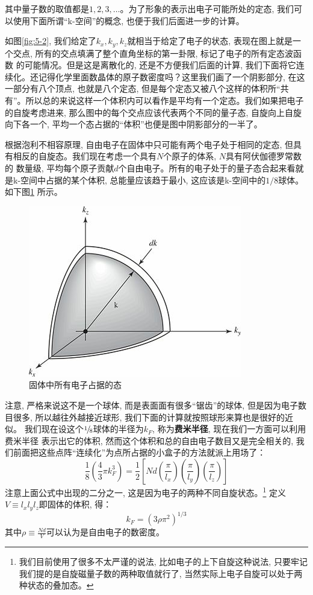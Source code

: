 其中量子数的取值都是$1,2,3,\ldots$。为了形象的表示出电子可能所处的定态, 我们可以使用下面所谓“k-空间”的概念, 也便于我们后面进一步的计算。


如图\ref{fig:5-2}, 我们给定了$k_x,k_y,k_z$就相当于给定了电子的状态, 表现在图上就是一个交点, 所有的交点填满了整个直角坐标的第一卦限, 标记了电子的所有定态波函数
的可能情况。但是这是离散化的, 还是不方便我们后面的计算, 我们下面将它连续化。还记得化学里面数晶体的原子数密度吗？这里我们画了一个阴影部分, 在这一部分有八个顶点, 也就是八个定态, 
但是每个定态又被八个这样的体积所“共有”。所以总的来说这样一个体积内可以看作是平均有一个定态。我们如果把电子的自旋考虑进来, 那么图中的每个交点应该代表两个不同的量子态,
自旋向上自旋向下各一个, 平均一个态占据的“体积”也便是图中阴影部分的一半了。

根据泡利不相容原理, 自由电子在固体中只可能有两个电子处于相同的定态, 但具有相反的自旋态。我们现在考虑一个具有$N$个原子的体系, $N$具有阿伏伽德罗常数的
数量级, 平均每个原子贡献$d$个自由电子。所有的电子处于的量子态合起来看就是k-空间中占据的某个体积, 总能量应该趋于最小, 这应该是k-空间中的$1/8$球体。如下图\ref{fig:5-3}
所示。
\begin{figure}
    \centering
    \includegraphics{fig/5-3.jpg}
    \caption{固体中所有电子占据的态}
    \label{fig:5-3}
\end{figure}

注意, 严格来说这不是一个球体, 而是表面面有很多“锯齿”的球体, 但是因为电子数目很多, 所以越往外越接近球形, 我们下面的计算就按照球形来算也是很好的近似。
我们现在设这个${\raise0.5ex\hbox{$\scriptstyle 1$}\kern-0.1em/\kern-0.15em\lower0.25ex\hbox{$\scriptstyle 8$}}$球体的半径为$k_F$, 称为\textbf{费米半径}, 现在我们一方面可以利用费米半径
表示出它的体积, 然而这个体积和总的自由电子数目又是完全相关的, 我们前面把这些点阵“连续化”为点所占据的小盒子的方法就派上用场了：
\begin{equation}
    \frac{1}{8}\left(\frac{4}{3}\pi k_F^3\right)=\frac{1}{2}\left[Nd\left(\frac{\pi}{l_x}\right)\left(\frac{\pi}{l_y}\right)\left(\frac{\pi}{l_z}\right)\right]
\end{equation}
注意上面公式中出现的二分之一, 这是因为电子的两种不同自旋状态。\footnote{我们目前使用了很多不太严谨的说法, 比如电子的上下自旋这种说法, 只要牢记我们提的是自旋磁量子数的两种取值就行了, 当然实际上电子自旋可以处于两种状态的叠加态。}
定义$V\equiv l_xl_yl_z$即固体的体积, 得：
\begin{equation}
    \label{eq:5.27}
    k_{F}=\left(3 \rho \pi^{2}\right)^{1 / 3}
\end{equation}
其中$\rho\equiv\frac{Nd}{V}$可以认为是自由电子的数密度。

